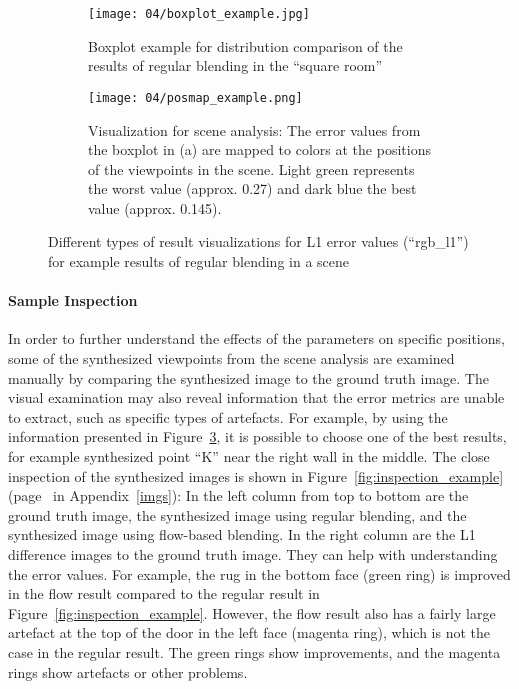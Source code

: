 \begin{figure}
\centering
    \hfill
    \begin{subfigure}[c]{0.5\textwidth}
            \centering
            \texttt{[image: 04/boxplot\_example.jpg]}
            \caption{Boxplot example for distribution comparison of the results of regular blending in the ``square room''} \label{fig:boxplot_example}
    \end{subfigure}%
    \hfill
    \begin{subfigure}[c]{0.5\textwidth}
            \centering
            \texttt{[image: 04/posmap\_example.png]}
            \caption{Visualization for scene analysis: The error values from the boxplot in (a) are mapped to colors at the positions of the viewpoints in the scene. Light green represents the worst value (approx. 0.27) and dark blue the best value (approx. 0.145).} \label{fig:posmap_example}
    \end{subfigure}
    \hfill
  \caption[Different types of result visualizations for L1 error values]{Different types of result visualizations for L1 error values (``rgb\_l1'') for example results of regular blending in a scene}
\end{figure}

\paragraph{Sample Inspection}
In order to further understand the effects of the parameters on specific positions, some of the synthesized viewpoints from the scene analysis are examined manually by comparing the synthesized image to the ground truth image. The visual examination may also reveal information that the error metrics are unable to extract, such as specific types of artefacts. For example, by using the information presented in Figure~\ref{fig:posmap_example}, it is possible to choose one of the best results, for example synthesized point ``K'' near the right wall in the middle. The close inspection of the synthesized images is shown in Figure~\ref{fig:inspection_example} (page~\pageref{fig:inspection_example} in Appendix~\ref{imgs}\footnotemark): In the left column from top to bottom are the ground truth image, the synthesized image using regular blending, and the synthesized image using flow-based blending. In the right column are the L1 difference images to the ground truth image. They can help with understanding the error values. For example, the rug in the bottom face (green ring) is improved in the flow result compared to the regular result in Figure~\ref{fig:inspection_example}. However, the flow result also has a fairly large artefact at the top of the door in the left face (magenta ring), which is not the case in the regular result. The green rings show improvements, and the magenta rings show artefacts or other problems.

